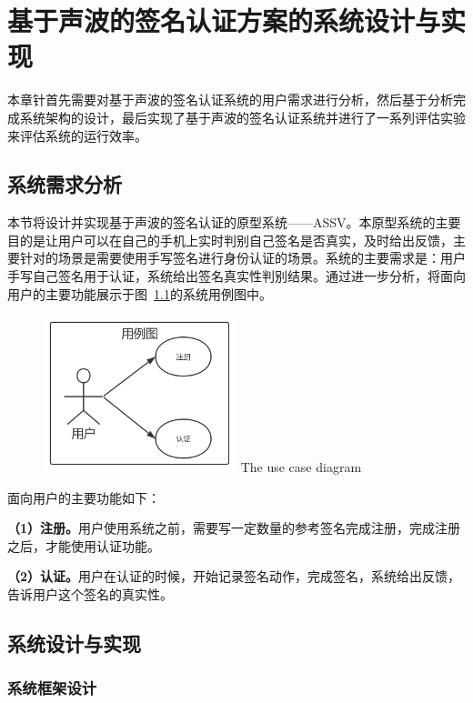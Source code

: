 \chapter{基于声波的签名认证方案的系统设计与实现}

本章针首先需要对基于声波的签名认证系统的用户需求进行分析，然后基于分析完成系统架构的设计，最后实现了基于声波的签名认证系统并进行了一系列评估实验来评估系统的运行效率。

\section{系统需求分析}

本节将设计并实现基于声波的签名认证的原型系统——ASSV。本原型系统的主要目的是让用户可以在自己的手机上实时判别自己签名是否真实，及时给出反馈，主要针对的场景是需要使用手写签名进行身份认证的场景。系统的主要需求是：用户手写自己签名用于认证，系统给出签名真实性判别结果。通过进一步分析，将面向用户的主要功能展示于图~\ref{fig:use-case}的系统用例图中。
\begin{figure}[!htp]
  \centering
  \includegraphics[width=0.5\textwidth]{figure/use-case.png}
      {The use case diagram}
  \label{fig:use-case}
\end{figure}

面向用户的主要功能如下：

\textbf{（1）注册。}用户使用系统之前，需要写一定数量的参考签名完成注册，完成注册之后，才能使用认证功能。

\textbf{（2）认证。}用户在认证的时候，开始记录签名动作，完成签名，系统给出反馈，告诉用户这个签名的真实性。


\section{系统设计与实现}
\subsection{系统框架设计}

